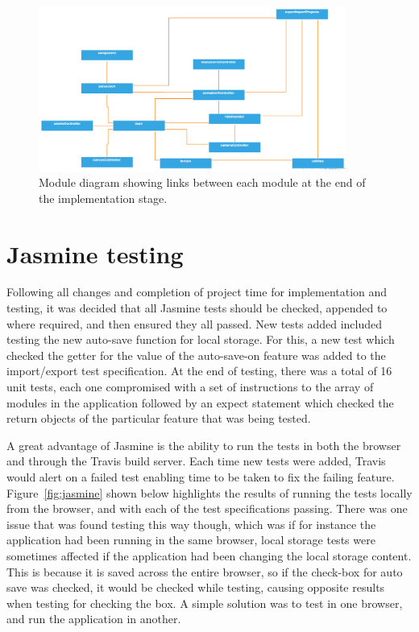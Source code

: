 \begin{figure}[h!]
  \centering
      \includegraphics[width=0.9\textwidth]{images/mod_after.png}
  \caption{Module diagram showing links between each module at the end of the implementation stage.}
  \label{fig:mod_after}
\end{figure}

\section{Jasmine testing}
Following all changes and completion of project time for implementation and testing, it was decided that all Jasmine tests should be checked, appended to where required, and then ensured they all passed. New tests added included testing the new auto-save function for local storage. For this, a new test which checked the getter for the value of the auto-save-on feature was added to the import/export test specification. At the end of testing, there was a total of 16 unit tests, each one compromised with a set of instructions to the array of modules in the application followed by an expect statement which checked the return objects of the particular feature that was being tested.

A great advantage of Jasmine is the ability to run the tests in both the browser and through the Travis build server. Each time new tests were added, Travis would alert on a failed test enabling time to be taken to fix the failing feature. Figure~\ref{fig:jasmine} shown below highlights the results of running the tests locally from the browser, and with each of the test specifications passing. There was one issue that was found testing this way though, which was if for instance the application had been running in the same browser, local storage tests were sometimes affected if the application had been changing the local storage content. This is because it is saved across the entire browser, so if the check-box for auto save was checked, it would be checked while testing, causing opposite results when testing for checking the box. A simple solution was to test in one browser, and run the application in another.

